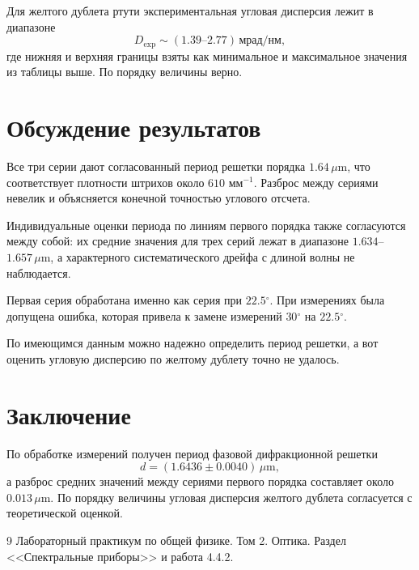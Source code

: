 \documentclass[twoside]{mfitjournal}
\newcommand{\degree}{\ensuremath{^\circ}}
\begin{document}
Для желтого дублета ртути экспериментальная угловая дисперсия лежит в диапазоне
\[
D_{\text{exp}}\sim (1.39\text{--}2.77)\,\text{мрад/нм},
\]
где нижняя и верхняя границы взяты как минимальное и максимальное значения из
таблицы выше. По порядку величины верно.

\section*{Обсуждение результатов}
Все три серии дают согласованный период решетки порядка $1.64\,\mu$m, что соответствует плотности штрихов около $610$ мм$^{-1}$. Разброс между сериями невелик и объясняется конечной точностью углового отсчета.

Индивидуальные оценки периода по линиям первого порядка также согласуются
между собой: их средние значения для трех серий лежат в диапазоне
$1.634$--$1.657\,\mu$m, а характерного систематического дрейфа с длиной волны
не наблюдается.

Первая серия обработана именно как серия при $22.5\degree$. При измерениях была допущена ошибка, которая привела к замене измерений $30\degree$ на $22.5\degree$.

По имеющимся данным можно надежно определить период решетки, а вот оценить
угловую дисперсию по желтому дублету точно не удалось.

\section*{Заключение}
По обработке измерений получен период фазовой дифракционной решетки
\[
d=(1.6436\pm0.0040)\,\mu\text{m},
\]
а разброс средних значений между сериями первого порядка составляет около
$0.013\,\mu$m.
По порядку величины угловая дисперсия желтого дублета согласуется с
теоретической оценкой.

\begin{thebibliography}{9}
Лабораторный практикум по общей физике. Том 2. Оптика. Раздел <<Спектральные приборы>> и работа 4.4.2.
\end{thebibliography}
\end{document}
